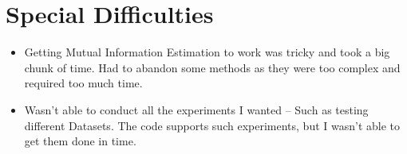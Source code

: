 \documentclass[dissertation.tex]{subfiles}
\begin{document}
\section*{Special Difficulties}
\begin{itemize}
  \item{
      Getting Mutual Information Estimation to work was tricky and took a big
      chunk of time. Had to abandon some methods as they were too complex and
      required too much time.
    }
  \item{
      Wasn't able to conduct all the experiments I wanted -- Such as testing
      different Datasets. The code supports such experiments, but I wasn't able
      to get them done in time.
    }
\end{itemize}

\newpage
\end{document}
